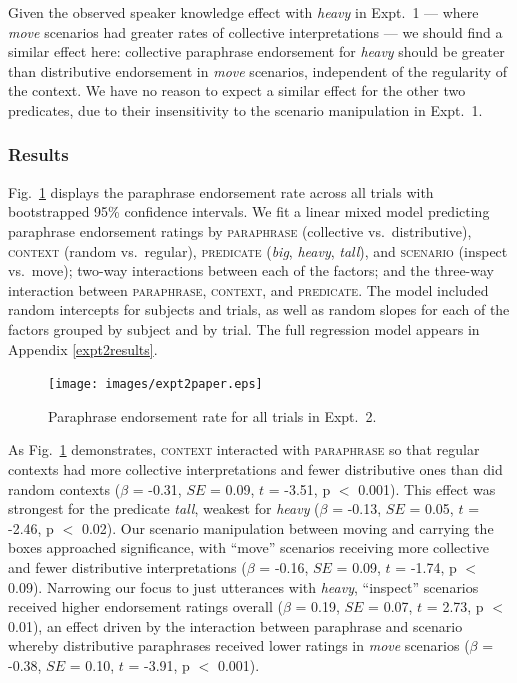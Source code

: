 \documentclass[linguex]{sp}
\begin{document}
Given the observed speaker knowledge effect with \emph{heavy} in Expt.~1 --- where \emph{move} scenarios had greater rates of collective interpretations --- we should find a similar effect here: collective paraphrase endorsement for \emph{heavy} should be greater than distributive endorsement in \emph{move} scenarios, independent of the regularity of the context. We have no reason to expect a similar effect for the other two predicates, due to their insensitivity to the scenario manipulation in Expt.~1.

\subsubsection{Results}


Fig.\ \ref{resultsexpt2} displays the paraphrase endorsement rate across all trials with bootstrapped 95\% confidence intervals. We fit a linear mixed model predicting paraphrase endorsement ratings by \textsc{paraphrase} (collective vs.~distributive), \textsc{context} (random vs.~regular),
\textsc{predicate} (\emph{big}, \emph{heavy}, \emph{tall}),
and \textsc{scenario} (inspect vs.~move); two-way interactions between each of the factors; and the three-way interaction between \textsc{paraphrase}, \textsc{context}, and \textsc{predicate}. The model included random intercepts for subjects and trials, as well as random slopes for each of the factors grouped by subject and by trial. The full regression model appears in Appendix \ref{expt2results}.

\begin{figure}[h!]
\centering
\texttt{[image: images/expt2paper.eps]} 
\vspace{-15pt}
\caption{Paraphrase endorsement rate for all trials in Expt.~2.}\label{resultsexpt2}
\end{figure}

As Fig.~\ref{resultsexpt2} demonstrates, \textsc{context} interacted with \textsc{paraphrase} so that regular contexts had more collective interpretations and fewer distributive ones than did random contexts ($\beta$ = -0.31, $SE$ = 0.09, $t$ = -3.51, p $<$ 0.001). This effect was strongest for the predicate \emph{tall}, weakest for \emph{heavy} ($\beta$ = -0.13, $SE$ = 0.05, $t$ = -2.46, p $<$ 0.02). Our scenario manipulation between moving and carrying the boxes approached significance, with ``move'' scenarios receiving more collective and fewer distributive interpretations ($\beta$ = -0.16, $SE$ = 0.09, $t$ = -1.74, p $<$ 0.09). Narrowing our focus to just utterances with \emph{heavy}, ``inspect'' scenarios received higher endorsement ratings overall ($\beta$ = 0.19, $SE$ = 0.07, $t$ = 2.73, p $<$ 0.01), an effect driven by the interaction between paraphrase and scenario whereby distributive paraphrases received lower ratings in \emph{move} scenarios ($\beta$ = -0.38, $SE$ = 0.10, $t$ = -3.91, p $<$ 0.001).
\end{document}
